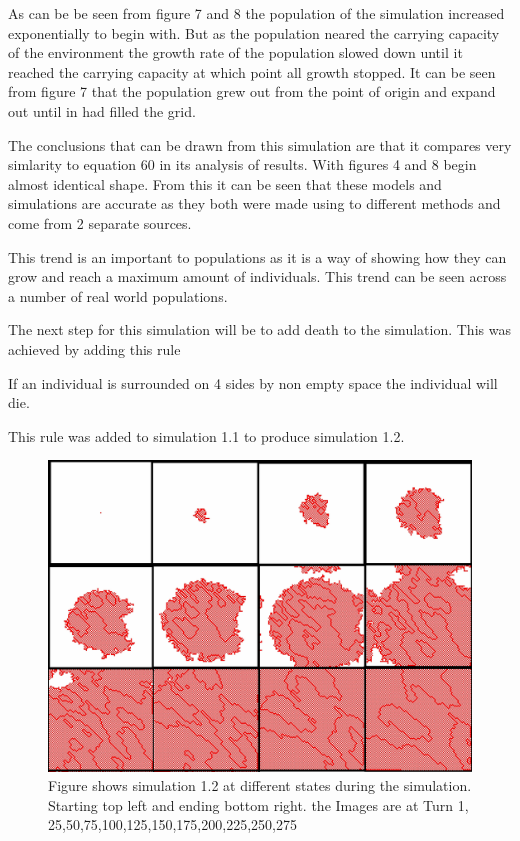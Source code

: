 \documentclass[final]{cmpreport}
\begin{document}
	As can be be seen from figure 7 and 8 the population of the simulation increased exponentially to begin with. But as the population neared the carrying capacity of the environment the growth rate of the population slowed down until it reached the carrying capacity at which point all growth stopped. It can be seen from figure 7 that the population grew out from the point of origin and expand out until in had filled the grid. 
	
	The conclusions that can be drawn from this simulation are that it compares very simlarity to equation 60 in its analysis of results. With figures 4 and 8 begin almost identical shape. From this it can be seen that these models and simulations are accurate as they both were made using to different methods and come from 2 separate sources.
	 
	
	This trend is an important to populations as it is a way of showing how they can grow and reach a maximum amount of individuals. This trend can be seen across a number of real world populations.
	
	The next step for this simulation will be to add death to the simulation. This was achieved by adding this rule
	
	If an individual is surrounded on 4 sides by non empty space the individual will die. 
	
	This rule was added to simulation 1.1 to produce simulation 1.2.
	
	\begin{figure}[h!] 
		\includegraphics[width=\textwidth]{simulation1_2Collage.png}
		\caption{Figure shows simulation 1.2 at different states during the simulation. Starting top left and ending bottom right. the Images are at Turn 1, 25,50,75,100,125,150,175,200,225,250,275}  
	\end{figure}
\end{document}
